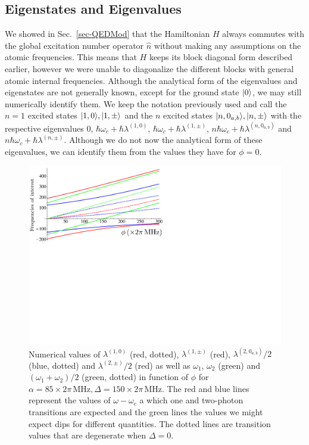 \subsection{Eigenstates and Eigenvalues}

We showed in Sec.~\ref{sec-QEDMod} that the Hamiltonian $H$ always commutes with the global excitation number operator $\hat n$ without making any assumptions on the atomic frequencies. This means that $H$ keeps its block diagonal form described earlier, however we were unable to diagonalize the different blocks with general atomic internal frequencies. Although the analytical form of the eigenvalues and eigenstates are not generally known, except for the ground state $| 0 \rangle$, we may still numerically identify them. We keep the notation previously used and call the $n=1$ excited states $| 1,0 \rangle, | 1,\pm \rangle$ and the $n$ excited states $| n,0_{a,b} \rangle, | n,\pm \rangle$ with the respective eigenvalues 0, $\hbar\omega_c+\hbar\lambda^{(1,0)}$, $\hbar\omega_c+\hbar\lambda^{(1,\pm)}$, $n\hbar \omega_c+\hbar\lambda^{(n,0_{a,b})}$ and $n\hbar \omega_c+\hbar\lambda^{(n,\pm)}$. Although we do not now the analytical form of these eigenvalues, we can identify them from the values they have for $\phi=0$. 

\begin{figure}
\center
\includegraphics[width=0.75 \textwidth]{Images/chap5/transitions.pdf}
\caption[Numerical values of $\lambda^{(1,0)}$]{Numerical values of $\lambda^{(1,0)}$ (red, dotted), $\lambda^{(1,\pm)}$ (red), $\lambda^{(2,0_{a,b})}/2$ (blue, dotted) and $\lambda^{(2,\pm)}/2$ (red) as well as $\omega_1$, $\omega_2$ (green) and $(\omega_1+\omega_2)/2$ (green, dotted) in function of $\phi$ for $\alpha = 85\times 2\pi\,\mbox{MHz}, \Delta = 150 \times 2\pi\,\mbox{MHz}$. The red and blue lines represent the values of $\omega-\omega_c$ a which one and two-photon transitions are expected and the green lines the values we might expect dips for different quantities. The dotted lines are  transition values that are degenerate when $\Delta=0$.}
\label{fig-trans}
\end{figure}

